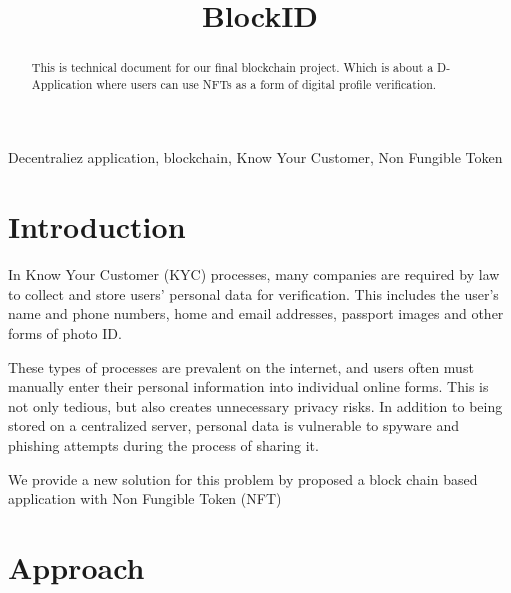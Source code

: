 \documentclass[conference]{IEEEtran}
\begin{document}
\title{BlockID}

\author{
\and
{}
}

\maketitle

\begin{abstract}
This is technical document for our final blockchain project. Which is about a D-Application where users can use NFTs as a form of digital profile verification.
\end{abstract}

\begin{IEEEkeywords}
Decentraliez application, blockchain, Know Your Customer, Non Fungible Token
\end{IEEEkeywords}

\section{Introduction}
In Know Your Customer (KYC) processes, many companies are required by law to collect and store users’ personal data for verification. This includes the user’s name and phone numbers, home and email addresses, passport images and other forms of photo ID.

These types of processes are prevalent on the internet, and users often must manually enter their personal information into individual online forms. This is not only tedious, but also creates unnecessary privacy risks. In addition to being stored on a centralized server, personal data is vulnerable to spyware and phishing attempts during the process of sharing it.

We provide a new solution for this problem by proposed a block chain based application with Non Fungible Token (NFT)

\section{Approach}
\end{document}
